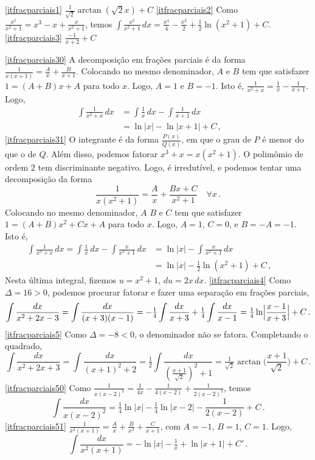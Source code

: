 \begin{Solution}{9.23}
\eqref{itfracparciais1} $\tfrac{1}{\sqrt{2}}\arctan(\sqrt{2}x)+C$
\eqref{itfracparciais2} Como $\frac{x^5}{x^2+1}=x^3-x+\frac{x}{x^2+1}$, temos
$\int\frac{x^5}{x^2+1}\,dx=\tfrac{x^4}{4}-\tfrac{x^2}{2}+\tfrac12\ln (x^2+1)+C$.
\eqref{itfracparciais3} $\frac{-1}{x+2}+C$

\eqref{itfracparciais30}
A decomposição em frações parciais é da forma
$\frac{1}{x(x+1)}=\frac{A}{x}+\frac{B}{x+1}$.
Colocando no mesmo denominador, $A$ e $B$
tem que satisfazer $1=(A+B)x+A$ para todo $x$. Logo, $A=1$ e $B=-1$. Isto é,
$\frac{1}{x^2+x}=\frac{1}{x}-\frac{1}{x+1}$. Logo,
\begin{align*}
\int \frac{1}{x^2+x}\,dx&=\int \frac{1}{x}\,dx-\int\frac{1}{x+1}\,dx\\
&=\ln |x|-\ln |x+1|+C\,,\quad\quad
\end{align*}
\eqref{itfracparciais31}
O integrante é da forma $\frac{P(x)}{Q(x)}$, em que o grau
de $P$ é menor do que o de $Q$. Além disso, podemos fatorar $x^3+x=x(x^2+1)$. O
polimômio de ordem $2$ tem discriminante negativo. Logo, é irredutível,
e podemos tentar uma decomposição da forma
$$
\frac{1}{x(x^2+1)}=\frac{A}{x}+\frac{Bx+C}{x^2+1}\quad \forall x\,.
$$
Colocando no mesmo denominador, $A$ $B$ e $C$
tem que satisfazer $1=(A+B)x^2+Cx+A$ para todo $x$. Logo, $A=1$, $C=0$, e
$B=-A=-1$. Isto é,
\begin{align*}
\int \frac{1}{x^3+x}\,dx=\int \frac{1}{x}\,dx-\int\frac{x}{x^2+1}\,dx
&=\ln |x|-\int\frac{x}{x^2+1}\,dx\\
&=\ln |x|-\tfrac{1}{2}\ln (x^2+1)+C\,,\quad\quad
\end{align*}
Nesta última integral, fizemos $u=x^2+1$, $du=2x\,dx$.
\eqref{itfracparciais4} Como $\Delta=16>0$, podemos procurar fatorar e fazer uma
separação em frações parciais,
$$\int\frac{dx}{x^2+2x-3}=\int\frac{dx}{(x+3)(x-1)}=-\tfrac14\int\frac{dx}{x+3}
+\tfrac14\int\frac{dx}{x-1}=\tfrac14\ln \Bigl|\frac{x-1}{x+3}\Bigr|+C\,.
$$
\eqref{itfracparciais5} Como $\Delta=-8<0$, o denominador não se fatora.
Completando o quadrado,
$$
\int\frac{dx}{x^2+2x+3}=\int\frac{dx}{(x+1)^2+2}=\tfrac12\int\frac{dx}{(\frac{x+
1}{\sqrt{2}})^2+1}=\tfrac{1}{\sqrt{2}}\arctan\bigl(\frac{x+
1}{\sqrt{2}}\bigr)+C\,.
$$
\eqref{itfracparciais50} Como
$\frac{1}{x(x-2)^2}=\frac{1}{4x}-\frac{1}{4(x-2)}+\frac{1}{2(x-2)^2}$, temos
$$
\int\frac{dx}{x(x-2)^2}=\tfrac14\ln|x|-\tfrac14\ln|x-2|-\frac{1}{2(x-2)}+C\,.
$$
\eqref{itfracparciais51}
$\frac{1}{x^2(x+1)}=\frac{A}{x}+\frac{B}{x^2}+\frac{C}{x+1}$, com $A=-1$,
$B=1$, $C=1$. Logo,
$$
\int\frac{dx}{x^2(x+1)}=-\ln |x|-\tfrac1x+\ln|x+1|+C'\,.
$$


\end{Solution}
